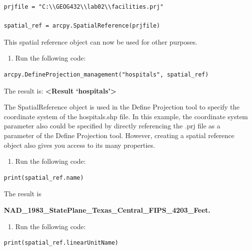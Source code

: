 \documentclass[]{article}
\providecommand{\tightlist}{%
  \setlength{\itemsep}{0pt}\setlength{\parskip}{0pt}}
\begin{document}
\begin{verbatim}
prjfile = "C:\\GEOG432\\lab02\\facilities.prj"

spatial_ref = arcpy.SpatialReference(prjfile)
\end{verbatim}

This spatial reference object can now be used for other purposes.

\begin{enumerate}
\def\labelenumi{\arabic{enumi}.}
\setcounter{enumi}{6}
\tightlist
\item
  Run the following code:
\end{enumerate}

\begin{verbatim}
arcpy.DefineProjection_management("hospitals", spatial_ref) 
\end{verbatim}

The result is: \textbf{\textless Result `hospitals'\textgreater{}}

The SpatialReference object is used in the Define Projection tool to
specify the coordinate system of the hospitals.shp file. In this
example, the coordinate system parameter also could be specified by
directly referencing the .prj file as a parameter of the Define
Projection tool. However, creating a spatial reference object also gives
you access to its many properties.

\begin{enumerate}
\def\labelenumi{\arabic{enumi}.}
\setcounter{enumi}{7}
\tightlist
\item
  Run the following code:
\end{enumerate}

\begin{verbatim}
print(spatial_ref.name)
\end{verbatim}

The result is

\textbf{NAD\_1983\_StatePlane\_Texas\_Central\_FIPS\_4203\_Feet.}

\begin{enumerate}
\def\labelenumi{\arabic{enumi}.}
\setcounter{enumi}{8}
\tightlist
\item
  Run the following code:
\end{enumerate}

\begin{verbatim}
print(spatial_ref.linearUnitName)
\end{verbatim}
\end{document}
